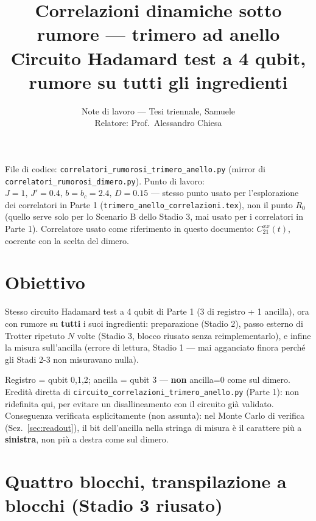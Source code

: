 \documentclass[11pt,a4paper]{article}
\title{\vspace{-1.5em}\color{inkblue}Correlazioni dinamiche sotto rumore --- trimero ad anello\\[0.2em]
\Large\normalfont\color{softgray}Circuito Hadamard test a 4 qubit, rumore su tutti gli ingredienti}
\author{Note di lavoro --- Tesi triennale, Samuele\\ Relatore: Prof.\ Alessandro Chiesa}
\date{}
\begin{document}
\sloppy
\maketitle
\thispagestyle{fancy}
\vspace{-2.0em}

File di codice:
\texttt{correlatori\_\allowbreak rumorosi\_trimero\_anello.py} (mirror di
\texttt{correlatori\_rumorosi\_dimero.py}). Punto di lavoro: $J=1,\,J'=0.4,\,b=b_c=2.4,\,D=0.15$
--- stesso punto usato per l'esplorazione dei correlatori in Parte 1
(\texttt{trimero\_\allowbreak anello\_correlazioni.tex}), non il punto
$R_0$ (quello serve solo per lo Scenario B dello Stadio 3, mai usato per i
correlatori in Parte 1). Correlatore usato come riferimento in questo
documento: $C_{21}^{xx}(t)$, coerente con la scelta del dimero.

\tableofcontents

\section{Obiettivo}

Stesso circuito Hadamard test a 4 qubit di Parte 1 (3 di registro + 1
ancilla), ora con rumore su \textbf{tutti} i suoi ingredienti:
preparazione (Stadio 2), passo esterno di Trotter ripetuto $N$ volte
(Stadio 3, blocco riusato senza reimplementarlo), e infine la misura
sull'ancilla (errore di lettura, Stadio 1 --- mai agganciato finora
perché gli Stadi 2-3 non misuravano nulla).

\begin{keyeq}[title={Convenzione qubit: diversa dal dimero, ereditata da Parte 1}]
Registro = qubit 0,1,2; ancilla = qubit 3 --- \textbf{non} ancilla=0 come
sul dimero. Eredità diretta di
\texttt{circuito\_\allowbreak correlazioni\_\allowbreak trimero\_anello.py}
(Parte 1): non ridefinita qui, per evitare un disallineamento con il
circuito già validato. Conseguenza verificata esplicitamente (non
assunta): nel Monte Carlo di verifica (Sez.~\ref{sec:readout}), il bit
dell'ancilla nella stringa di misura è il carattere più a
\textbf{sinistra}, non più a destra come sul dimero.
\end{keyeq}

\section{Quattro blocchi, transpilazione a blocchi (Stadio 3 riusato)}
\end{document}
